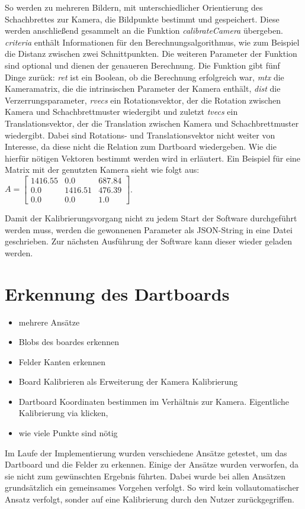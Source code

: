So werden zu mehreren Bildern, mit unterschiedlicher Orientierung des Schachbrettes zur Kamera, die Bildpunkte bestimmt und gespeichert. Diese werden anschließend gesammelt an die Funktion \textit{calibrateCamera} übergeben. \textit{criteria} enthält Informationen für den Berechnungsalgorithmus, wie zum Beispiel die Distanz zwischen zwei Schnittpunkten. Die weiteren Parameter der Funktion sind optional und dienen der genaueren Berechnung.
Die Funktion gibt fünf Dinge zurück: \textit{ret} ist ein Boolean, ob die Berechnung erfolgreich war, \textit{mtx} die Kameramatrix, die die intrinsischen Parameter der Kamera enthält, \textit{dist} die Verzerrungsparameter, \textit{rvecs} ein Rotationsvektor, der die Rotation zwischen Kamera und Schachbrettmuster wiedergibt und zuletzt \textit{tvecs} ein Translationsvektor, der die Translation zwischen Kamera und Schachbrettmuster wiedergibt. Dabei sind Rotations- und Translationsvektor nicht weiter von Interesse, da diese nicht die Relation zum Dartboard wiedergeben. Wie die hierfür nötigen Vektoren bestimmt werden wird in  erläutert. Ein Beispiel für eine Matrix mit der genutzten Kamera sieht wie folgt aus:
$A= 
\begin{bmatrix} 
1416.55 & 0.0 & 687.84 \\
0.0 & 1416.51 & 476.39 \\
0.0 & 0.0 & 1.0\end{bmatrix}$.

Damit der Kalibrierungsvorgang nicht zu jedem Start der Software durchgeführt werden muss, werden die gewonnenen Parameter als JSON-String in eine Datei geschrieben. Zur nächsten Ausführung der Software kann dieser wieder geladen werden. 


\section{Erkennung des Dartboards}
\label{sec:board}
\begin{itemize}
\item     mehrere Ansätze
\item     Blobs des boardes erkennen
\item     Felder Kanten erkennen
\item     Board Kalibrieren als Erweiterung der Kamera Kalibrierung
        
\item        Dartboard Koordinaten bestimmen im Verhältnis zur Kamera. Eigentliche Kalibrierung via klicken,
\item       wie viele Punkte sind nötig

\end{itemize}
Im Laufe der Implementierung wurden verschiedene Ansätze getestet, um das Dartboard und die Felder zu erkennen. Einige der Ansätze wurden verworfen, da sie nicht  zum gewünschten Ergebnis führten. Dabei wurde bei allen Ansätzen grundsätzlich ein gemeinsames Vorgehen verfolgt. So wird kein vollautomatischer Ansatz verfolgt, sonder auf eine Kalibrierung durch den Nutzer zurückgegriffen. 

